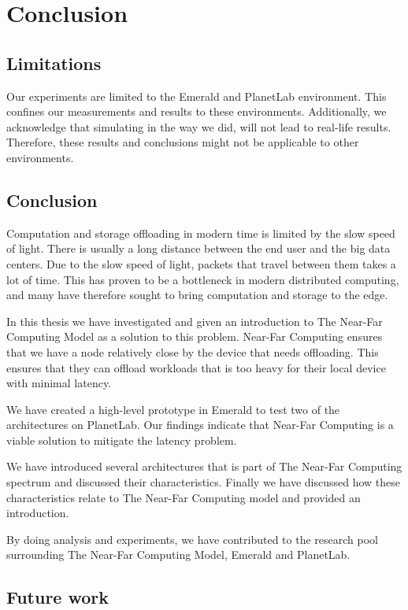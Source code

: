 \chapter{Conclusion}

\section{Limitations}
Our experiments are limited to the Emerald and PlanetLab environment. This confines our measurements and results to these environments. Additionally, we acknowledge that simulating in the way we did, will not lead to real-life results. Therefore, these results and conclusions might not be applicable to other environments.


\section{Conclusion}
Computation and storage offloading in modern time is limited by the slow speed of light. There is usually a long distance between the end user and the big data centers. Due to the slow speed of light, packets that travel between them takes a lot of time. This has proven to be a bottleneck in modern distributed computing, and many have therefore sought to bring computation and storage to the edge. 

In this thesis we have investigated and given an introduction to The Near-Far Computing Model as a solution to this problem. Near-Far Computing ensures that we have a node relatively close by the device that needs offloading. This ensures that they can offload workloads that is too heavy for their local device with minimal latency. 

We have created a high-level prototype in Emerald to test two of the architectures on PlanetLab. Our findings indicate that Near-Far Computing is a viable solution to mitigate the latency problem. 

We have introduced several architectures that is part of The Near-Far Computing spectrum and discussed their characteristics. Finally we have discussed how these characteristics relate to The Near-Far Computing model and provided an introduction.

By doing analysis and experiments, we have contributed to the research pool surrounding The Near-Far Computing Model, Emerald and PlanetLab.



\section{Future work}
